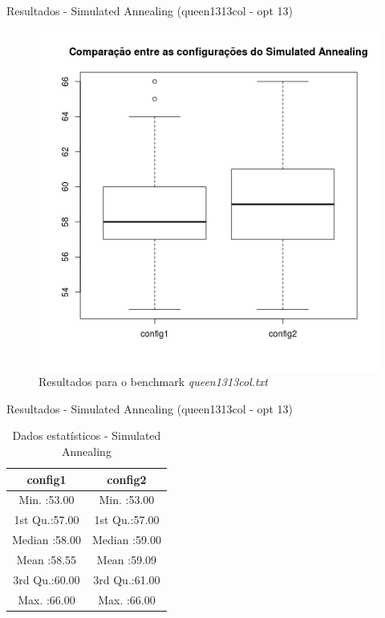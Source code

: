 \documentclass[compress, hide notes]{beamer}
\begin{document}
        \begin{frame}{Resultados - Simulated Annealing (queen1313col - opt 13)}
        
        	\begin{figure}[H]
			\centering
            \label{fig:sol-sa-queen1313col}
            \includegraphics[width=0.5\linewidth]{img/sa-sol-queen1313col.png}
            \caption[Resultados para o benchmark queen1313col.txt]{Resultados para o benchmark \textit{queen1313col.txt}}
			\end{figure}

		\end{frame}
        
        \begin{frame}{Resultados - Simulated Annealing (queen1313col - opt 13)}
        
        	\begin{table}[H]
            \centering
              \begin{tabular}{c|c}
               \textbf{config1}       &  \textbf{config2}                        \\ \hline \hline
               Min.   :53.00 &         Min.   :53.00           \\ \hline
               1st Qu.:57.00 &          1st Qu.:57.00          \\ \hline
               Median :58.00 &         Median :59.00           \\ \hline
               Mean   :58.55 &          Mean   :59.09          \\ \hline
               3rd Qu.:60.00 &          3rd Qu.:61.00          \\ \hline
               Max.   :66.00 &          Max.   :66.00          \\
              \end{tabular}
              \caption {Dados estatísticos - Simulated Annealing}
        	\end{table}
		\end{frame}
        
\end{document}
